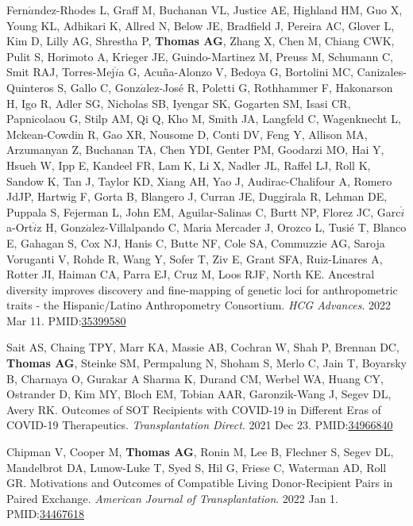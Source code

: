 \documentclass[10pt]{article}
\makeatletter
\newlength{\bibhang}
\newlength{\bibsep}
 {\@listi \global\bibsep\itemsep \global\advance\bibsep by\parsep}
\newenvironment{bibenum*}
  {\renewcommand\labelenumi{[\theenumi]}%
   \etaremune[
     topsep=0pt,
     itemsep=\bibsep,
     parsep=0pt,partopsep=0pt,
     itemindent=-\bibhang,
     leftmargin={\bibhang+\widthof{[999]}}]}
  {\endetaremune}
\newcommand{\pmid}[1]{PMID:\href{https://www.ncbi.nlm.nih.gov/pubmed/#1}{#1}}
\makeatother
\begin{document}
\begin{bibenum*}
\item Fern$\acute{a}$ndez-Rhodes L, Graff M, Buchanan VL, 
  Justice AE, Highland HM, Guo X, Young KL, Adhikari K,
  Allred N, Below JE, Bradfield J, Pereira AC, Glover L,
  Kim D, Lilly AG, Shrestha P, \textbf{Thomas AG}, Zhang X,
  Chen M, Chiang CWK, Pulit S, Horimoto A, Krieger JE, Guindo-Martinez M,
  Preuss M, Schumann C, Smit RAJ, Torres-Mej$\acute{i}$a G, 
  Acuña-Alonzo V, Bedoya G, Bortolini MC, 
  Canizales-Quinteros S, Gallo C, Gonz$\acute{a}$lez-José R, 
  Poletti G, Rothhammer F, Hakonarson H, Igo R, Adler SG, 
  Nicholas SB, Iyengar SK, Gogarten SM, Isasi CR, 
  Papnicolaou G, Stilp AM, Qi Q, Kho M, Smith JA, 
  Langfeld C, Wagenknecht L, Mckean-Cowdin R, Gao XR, 
  Nousome D, Conti DV, Feng Y, Allison MA, Arzumanyan Z, 
  Buchanan TA, Chen YDI, Genter PM, Goodarzi MO, Hai Y, 
  Hsueh W, Ipp E, Kandeel FR, Lam K, Li X, Nadler JL, 
  Raffel LJ, Roll K, Sandow K, Tan J, Taylor KD, Xiang AH, 
  Yao J, Audirac-Chalifour A, Romero JdJP, Hartwig F, 
  Gorta B, Blangero J, Curran JE, Duggirala R, Lehman DE, 
  Puppala S, Fejerman L, John EM, Aguilar-Salinas C, 
  Burtt NP, Florez JC, Garc$\acute{i}$a-Ort$\acute{i}$z H, 
  Gonz$\acute{a}$lez-Villalpando C, 
  Maria Mercader J, Orozco L, Tusié T, Blanco E, Gahagan S, 
  Cox NJ, Hanis C, Butte NF, Cole SA, Commuzzie AG, 
  Saroja Voruganti V, Rohde R, Wang Y, Sofer T, Ziv E, 
  Grant SFA, Ruiz-Linares A, Rotter JI, Haiman CA, 
  Parra EJ, Cruz M, Loos RJF, North KE.
  Ancestral diversity improves discovery and 
  fine-mapping of genetic loci 
  for anthropometric traits - 
  the Hispanic/Latino Anthropometry Consortium.
  \emph{HCG Advances}. 2022 Mar 11.
  \pmid{35399580} 

\item Sait AS, Chaing TPY, Marr KA, Massie AB, Cochran W, 
  Shah P, Brennan DC, \textbf{Thomas AG}, Steinke SM, 
  Permpalung N, Shoham S, Merlo C, Jain T, Boyarsky B, 
  Charnaya O, Gurakar A Sharma K, Durand CM, Werbel WA,
  Huang CY, Ostrander D, Kim MY, Bloch EM, Tobian AAR,
  Garonzik-Wang J, Segev DL, Avery RK.
  Outcomes of SOT Recipients with COVID-19 in 
  Different Eras of COVID-19 Therapeutics.
  \emph{Transplantation Direct}. 2021 Dec 23.
  \pmid{34966840} 

\item Chipman V, Cooper M, \textbf{Thomas AG}, Ronin M,
  Lee B, Flechner S, Segev DL, Mandelbrot DA, Lunow-Luke T,
  Syed S, Hil G, Friese C, Waterman AD, Roll GR.
  Motivations and Outcomes of Compatible Living 
  Donor-Recipient Pairs in Paired Exchange.
  \emph{American Journal of Transplantation}. 2022 Jan 1.
  \pmid{34467618} 


\end{bibenum*}
\end{document}
